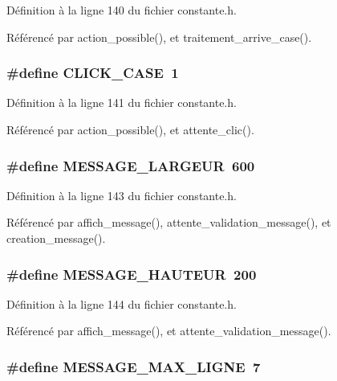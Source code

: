D\'{e}finition \`{a} la ligne 140 du fichier constante.h.

R\'{e}f\'{e}renc\'{e} par action\_\-possible(), et traitement\_\-arrive\_\-case().
\subsubsection{\setlength{\rightskip}{0pt plus 5cm}\#define CLICK\_\-CASE~1}\label{constante_8h_d37434a395a7384cb1afce9919ce1e25}




D\'{e}finition \`{a} la ligne 141 du fichier constante.h.

R\'{e}f\'{e}renc\'{e} par action\_\-possible(), et attente\_\-clic().
\subsubsection{\setlength{\rightskip}{0pt plus 5cm}\#define MESSAGE\_\-LARGEUR~600}\label{constante_8h_8c16c743f2a1a0ed56ad304b44c503c3}




D\'{e}finition \`{a} la ligne 143 du fichier constante.h.

R\'{e}f\'{e}renc\'{e} par affich\_\-message(), attente\_\-validation\_\-message(), et creation\_\-message().
\subsubsection{\setlength{\rightskip}{0pt plus 5cm}\#define MESSAGE\_\-HAUTEUR~200}\label{constante_8h_ee86e90f9ca815aa98bfa6a0b28e28fc}




D\'{e}finition \`{a} la ligne 144 du fichier constante.h.

R\'{e}f\'{e}renc\'{e} par affich\_\-message(), et attente\_\-validation\_\-message().
\subsubsection{\setlength{\rightskip}{0pt plus 5cm}\#define MESSAGE\_\-MAX\_\-LIGNE~7}\label{constante_8h_c3b55368e71f0f918d834346c8b1184d}




